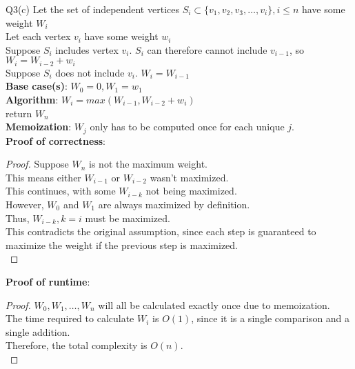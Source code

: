 \begin{problem}
  {Q3(c)}
  Let the set of independent vertices $S_i \subset \{v_1,v_2,v_3,\dots,v_i\}, i \leq n$ have some weight $W_i$ \\
  Let each vertex $v_i$ have some weight $w_i$ \\
  Suppose $S_i$ includes vertex $v_i$. $S_i$ can therefore cannot include $v_{i-1}$, so $W_i = W_{i-2} + w_i$ \\
  Suppose $S_i$ does not include $v_i$. $W_i = W_{i-1}$ \\
  \textbf{Base case(s)}: $W_0 = 0, W_1 = w_1$ \\
  \textbf{Algorithm}:
  $W_i = max(W_{i-1}, W_{i-2} + w_i)$ \\
  return $W_n$ \\
  \textbf{Memoization}: $W_j$ only has to be computed once for each unique $j$. \\
  \textbf{Proof of correctness}:
  \begin{proof}
    Suppose $W_n$ is not the maximum weight. \\
    This means either $W_{i-1}$ or $W_{i-2}$ wasn't maximized. \\
    This continues, with some $W_{i - k}$ not being maximized. \\
    However, $W_0$ and $W_1$ are always maximized by definition. \\
    Thus, $W_{i - k}, k = i$ must be maximized. \\
    This contradicts the original assumption, since each step is guaranteed to maximize the weight if the previous step is maximized. \\
  \end{proof}
  \textbf{Proof of runtime}:
  \begin{proof}
    $W_0, W_1, \dots, W_n$ will all be calculated exactly once due to memoization. \\
    The time required to calculate $W_i$ is $O(1)$, since it is a single comparison and a single addition. \\
    Therefore, the total complexity is $O(n)$. \\
  \end{proof}
\end{problem}
